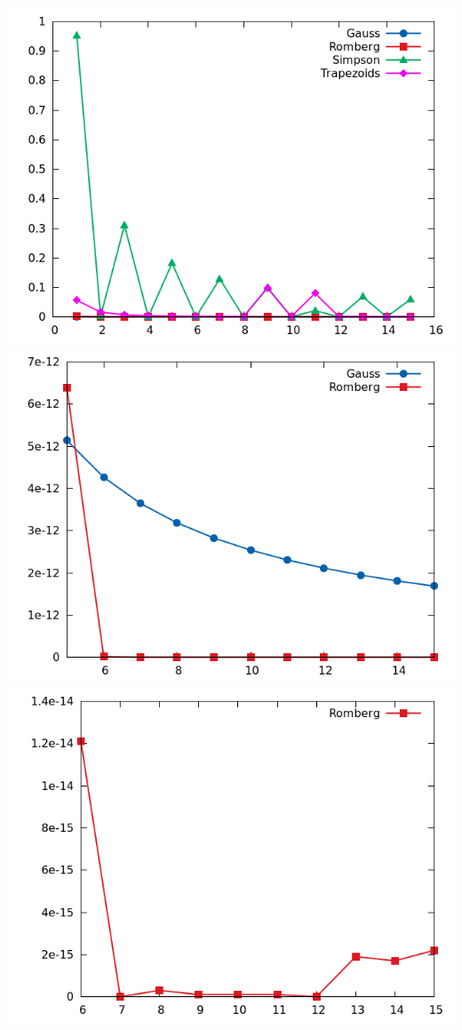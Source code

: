 \documentclass[11pt,leqno]{article}
\begin{document}
\begin{center}
\includegraphics[scale=0.65,natwidth=640,natheight=480]{plot/test1_15e.png}\\
\includegraphics[scale=0.65,natwidth=640,natheight=480]{plot/test1_15ezoom.png}\\
\includegraphics[scale=0.65,natwidth=640,natheight=480]{plot/test1_r15ezoom.png}
\end{center}
\end{document}
